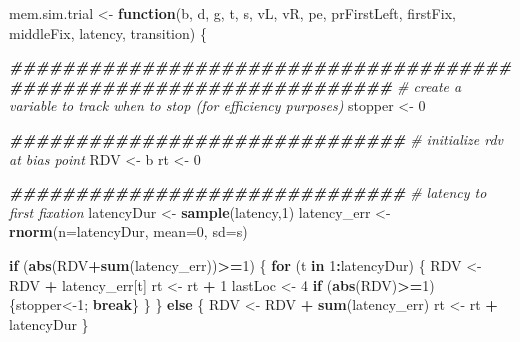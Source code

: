 \documentclass[
]{book}
\newenvironment{Shaded}{\begin{snugshade}}{\end{snugshade}}
\newcommand{\AttributeTok}[1]{\textcolor[rgb]{0.13,0.29,0.53}{#1}}
\newcommand{\CommentTok}[1]{\textcolor[rgb]{0.56,0.35,0.01}{\textit{#1}}}
\newcommand{\ControlFlowTok}[1]{\textcolor[rgb]{0.13,0.29,0.53}{\textbf{#1}}}
\newcommand{\DecValTok}[1]{\textcolor[rgb]{0.00,0.00,0.81}{#1}}
\newcommand{\DocumentationTok}[1]{\textcolor[rgb]{0.56,0.35,0.01}{\textbf{\textit{#1}}}}
\newcommand{\FunctionTok}[1]{\textcolor[rgb]{0.13,0.29,0.53}{\textbf{#1}}}
\newcommand{\NormalTok}[1]{#1}
\newcommand{\OtherTok}[1]{\textcolor[rgb]{0.56,0.35,0.01}{#1}}
\newcommand{\SpecialCharTok}[1]{\textcolor[rgb]{0.81,0.36,0.00}{\textbf{#1}}}
\begin{document}
\begin{Shaded}
\begin{Highlighting}[]
\NormalTok{mem.sim.trial }\OtherTok{\textless{}{-}} \ControlFlowTok{function}\NormalTok{(b, d, g, t, s, vL, vR, pe, prFirstLeft, firstFix, middleFix, latency, transition) \{}
  
  \DocumentationTok{\#\#\#\#\#\#\#\#\#\#\#\#\#\#\#\#\#\#\#\#\#\#\#\#\#\#\#\#\#\#\#\#\#\#\#\#\#\#\#\#\#\#\#\#\#\#\#\#\#\#\#\#\#\#\#\#\#\#\#\#\#\#\#\#\#\#\#}
  \CommentTok{\# create a variable to track when to stop (for efficiency purposes)}
\NormalTok{  stopper }\OtherTok{\textless{}{-}} \DecValTok{0}
  
  \DocumentationTok{\#\#\#\#\#\#\#\#\#\#\#\#\#\#\#\#\#\#\#\#\#\#\#\#\#\#\#\#\#\#}
  \CommentTok{\# initialize rdv at bias point}
\NormalTok{  RDV }\OtherTok{\textless{}{-}}\NormalTok{ b}
\NormalTok{  rt  }\OtherTok{\textless{}{-}} \DecValTok{0}
  
  \DocumentationTok{\#\#\#\#\#\#\#\#\#\#\#\#\#\#\#\#\#\#\#\#\#\#\#\#\#\#\#\#\#\#}
  \CommentTok{\# latency to first fixation}
\NormalTok{  latencyDur }\OtherTok{\textless{}{-}} \FunctionTok{sample}\NormalTok{(latency,}\DecValTok{1}\NormalTok{)}
\NormalTok{  latency\_err }\OtherTok{\textless{}{-}} \FunctionTok{rnorm}\NormalTok{(}\AttributeTok{n=}\NormalTok{latencyDur, }\AttributeTok{mean=}\DecValTok{0}\NormalTok{, }\AttributeTok{sd=}\NormalTok{s)}
  
  \ControlFlowTok{if}\NormalTok{ (}\FunctionTok{abs}\NormalTok{(RDV}\SpecialCharTok{+}\FunctionTok{sum}\NormalTok{(latency\_err))}\SpecialCharTok{\textgreater{}=}\DecValTok{1}\NormalTok{) \{}
    \ControlFlowTok{for}\NormalTok{ (t }\ControlFlowTok{in} \DecValTok{1}\SpecialCharTok{:}\NormalTok{latencyDur) \{}
\NormalTok{      RDV }\OtherTok{\textless{}{-}}\NormalTok{ RDV }\SpecialCharTok{+}\NormalTok{ latency\_err[t]}
\NormalTok{      rt }\OtherTok{\textless{}{-}}\NormalTok{ rt }\SpecialCharTok{+} \DecValTok{1}
\NormalTok{      lastLoc }\OtherTok{\textless{}{-}} \DecValTok{4}
      \ControlFlowTok{if}\NormalTok{ (}\FunctionTok{abs}\NormalTok{(RDV)}\SpecialCharTok{\textgreater{}=}\DecValTok{1}\NormalTok{) \{stopper}\OtherTok{\textless{}{-}}\DecValTok{1}\NormalTok{; }\ControlFlowTok{break}\NormalTok{\}}
\NormalTok{    \}}
\NormalTok{  \} }\ControlFlowTok{else}\NormalTok{ \{}
\NormalTok{    RDV }\OtherTok{\textless{}{-}}\NormalTok{ RDV }\SpecialCharTok{+} \FunctionTok{sum}\NormalTok{(latency\_err)}
\NormalTok{    rt }\OtherTok{\textless{}{-}}\NormalTok{ rt }\SpecialCharTok{+}\NormalTok{ latencyDur}
\NormalTok{  \}}
  

\end{Highlighting}
\end{Shaded}
\end{document}
